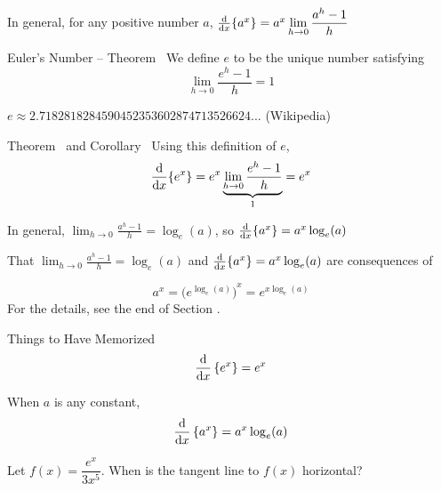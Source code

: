 \begin{frame}[t]
In general, for any positive number $a$, $\frac{\text{d}}{\text{d}x}\{a^x\} = a^x \displaystyle\lim_{h \rightarrow 0} \frac{a^h-1}{h}$ \pause

\begin{block}{Euler's Number -- Theorem~}
We define $e$ to be the unique number satisfying 
\[\displaystyle\lim_{h \rightarrow 0} \frac{e^h-1}{h}=1\]
\end{block}
\pause
$e \approx 2.7182818284590452353602874713526624...$
(Wikipedia)
\end{frame}
\begin{frame}
\begin{block}{Theorem~ and Corollary~}
Using this definition of $e$,
\[\frac{\text{d}}{\text{d}x}\{e^x\} = e^x\underbrace{\lim_{h \rightarrow 0}\frac{e^h-1}{h}}_1=e^x\]
\pause

In general, $\displaystyle\lim_{h \rightarrow 0} \frac{a^h-1}{h} = \log_e (a)$, so
$\frac{\text{d}}{\text{d}x}\{a^x\}=a^x\log_e(a)$
\end{block}

That $\displaystyle\lim_{h \rightarrow 0} \frac{a^h-1}{h} = \log_e (a)$ and
$\frac{\text{d}}{\text{d}x}\{a^x\}=a^x\log_e(a)$ are consequences of

\[\displaystyle a^x = {\big(e^{\log_e(a)}\big)}^x
                    =e^{x\log_e(a)}\]
For the details, see the end of Section .
\end{frame}
\begin{frame}[t]
\AnswerSpace{}
\begin{block}{Things to Have Memorized}
\[\frac{\text{d}}{\text{d}x}\left\{e^x\right\}=e^x\]\pause

When $a$ is any constant, \[\frac{\text{d}}{\text{d}x}\left\{a^x\right\}=a^x\log_e(a)\]
\end{block}\pause

Let $f(x)=\dfrac{e^x}{3x^5}$. When is the tangent line to $f(x)$ horizontal?
 \end{frame}
